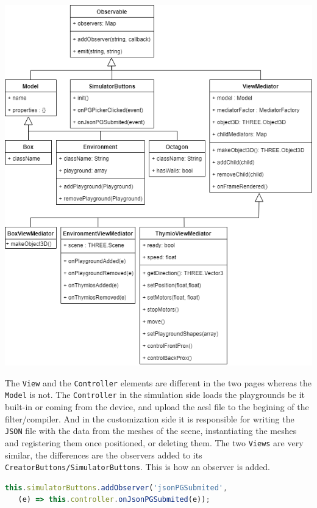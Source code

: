 \documentclass{scrbook}
\begin{document}
\begin{center}
  \includegraphics[width=\textwidth]{./mvc_cd}
\end{center}

The \texttt{View} and the \texttt{Controller} elements are different in the two pages whereas the \texttt{Model} is not. The \texttt{Controller} in the simulation side loads the playgrounds be it built-in or coming from the device, and upload the aesl file to the begining of the filter/compiler. 
And in the customization side it is responsible for writing the \texttt{JSON} file with the data from the meshes of the scene,  instantiating the meshes and registering them once positioned, or deleting them. The two \texttt{Views} are very similar, 
the differences are the observers added to its \texttt{CreatorButtons/SimulatorButtons}. This is how an observer is added.
\begin{lstlisting}[language=JavaScript, basicstyle=\ttfamily\small]
  this.simulatorButtons.addObserver('jsonPGSubmited',
   (e) => this.controller.onJsonPGSubmited(e));
\end{lstlisting} 
\end{document}
